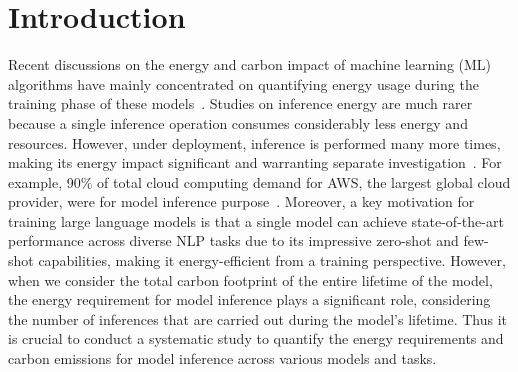 \section{Introduction}






Recent discussions on the energy and carbon impact of machine learning (ML) algorithms have mainly concentrated on quantifying energy usage during the training phase of these models~\cite{dodge2022measuring, luccioni2023counting, patterson2021carbon, raffel2020exploring}. Studies on inference energy are much rarer because a single inference operation consumes considerably less energy and resources. However, under deployment, inference is performed many more times, making its energy impact significant and warranting separate investigation~\cite{wu2022sustainable,patterson2022carbon}. For example, 90\% of total cloud computing demand for AWS, the largest global cloud provider, were for model inference purpose~\cite{barr2019amazon}. 
%
Moreover, a key motivation for training large language models is that a single model can achieve state-of-the-art performance across diverse NLP tasks due to its impressive zero-shot and few-shot capabilities, making it energy-efficient from a training perspective. However, when we consider the total carbon footprint of the entire lifetime of the model, the energy requirement for model inference plays a significant role, considering the number of inferences that are carried out during the model's lifetime. 
%
Thus it is crucial to conduct a systematic study to quantify the energy requirements and carbon emissions for model inference across various models and tasks.


